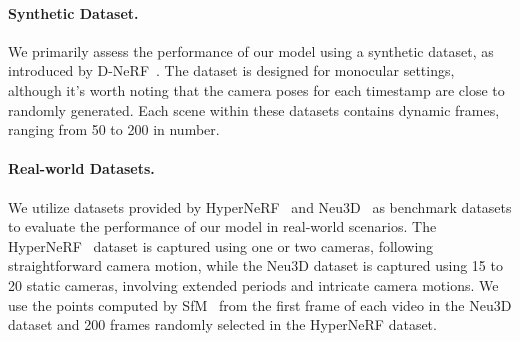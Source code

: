 \documentclass[10pt,twocolumn,letterpaper]{article}
\begin{document}

\paragraph{Synthetic Dataset.}We primarily assess the performance of our model using a synthetic dataset, as introduced by D-NeRF~\cite{pumarola2021dnerf}. The dataset is designed for monocular settings, although it's worth noting that the camera poses for each timestamp are close to randomly generated. Each scene within these datasets contains dynamic frames, ranging from 50 to 200 in number.
\paragraph{Real-world Datasets.} We utilize datasets provided by HyperNeRF~\cite{park2021hypernerf} and Neu3D~\cite{li2022neural} as benchmark datasets to evaluate the performance of our model in real-world scenarios. The HyperNeRF~\cite{park2021hypernerf} dataset is captured using one or two cameras, following straightforward camera motion, while the Neu3D dataset is captured using 15 to 20 static cameras, involving extended periods and intricate camera motions. We use the points computed by SfM~\cite{schonberger2016structure} from the first frame of each video in the Neu3D dataset and 200 frames randomly selected in the HyperNeRF dataset.
\end{document}
